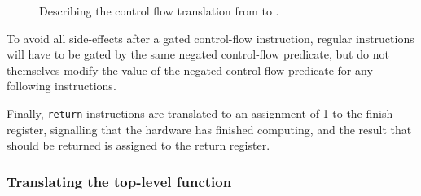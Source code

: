 \begin{figure}
  \centering
  \caption[Describing the control flow translation from \rtlsubpar{} to
  \htl{}.]{Describing the control flow translation from \rtlsubpar{} to
    \htl{}.}%
  \label{fig:hg:htl-generation:cf}
\end{figure}

To avoid all side-effects after a gated control-flow instruction, regular
instructions will have to be gated by the same negated control-flow predicate,
but do not themselves modify the value of the negated control-flow predicate for
any following instructions.

Finally, \texttt{return} instructions are translated to an assignment of 1 to
the \htl{} finish register, signalling that the hardware has finished computing,
and the result that should be returned is assigned to the return register.

\subsubsection{Translating the top-level function}

